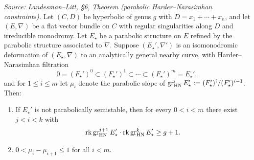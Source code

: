 \begin{theorem}
  \label{thm:hn-constraints-parabolic}
  \textit{Source: Landesman--Litt, \S6, Theorem (parabolic Harder--Narasimhan constraints).}
  Let $(C, D)$ be hyperbolic of genus $g$ with $D = x_1 + \cdots + x_n$, and let
  $(E, \nabla)$ be a flat vector bundle on $C$ with regular singularities along
  $D$ and irreducible monodromy. Let $E_\star$ be a parabolic structure on $E$
  refined by the parabolic structure associated to $\nabla$. Suppose
  $(E_\star', \nabla')$ is an isomonodromic deformation of $(E_\star, \nabla)$ to
  an analytically general nearby curve, with Harder--Narasimhan filtration
  \[
    0 = (F_\star')^0 \subset (F_\star')^1 \subset \cdots \subset (F_\star')^m =
    E_\star',
  \]
  and for $1 \leq i \leq m$ let $\mu_i$ denote the parabolic slope of
  $\operatorname{gr}^i_{\mathrm{HN}} E_\star' := (F_\star')^i / (F_\star')^{i-1}$. Then:
  \begin{enumerate}
    \item If $E_\star'$ is not parabolically semistable, then for every
      $0 < i < m$ there exist $j < i < k$ with
      \[
        \operatorname{rk} \operatorname{gr}^{j+1}_{\mathrm{HN}} E_\star' \cdot \operatorname{rk} \operatorname{gr}^k_{\mathrm{HN}} E_\star' \geq g + 1.
      \]
    \item $0 < \mu_i - \mu_{i+1} \leq 1$ for all $i < m$.
  \end{enumerate}
\end{theorem}

